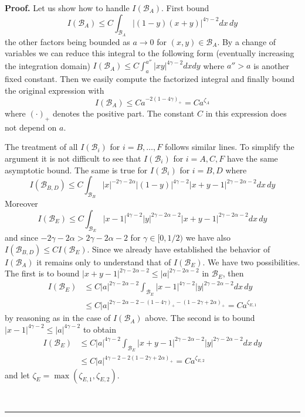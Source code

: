 \documentclass[a4paper,11pt,reqno]{article}
\newcommand{\cB}{\mathcal{B}}
\newenvironment{proof}[1][Proof]{\textbf{#1.} }{\ \rule{0.5em}{0.5em}}
\begin{document}
\begin{proof}
Let us show how to handle $I(\cB_A)$. First bound
$$
I(\cB_A) \le C \int_{\cB_A} 
|(1-y)(x+y)|^{4\gamma-2} d x\, d y
$$
the other factors being bounded as $a \to 0$ for $(x,y) \in \cB_A$. By a change of variables we can reduce this integral to the following  form (eventually increasing the integration domain)
$
I(\cB_A) \le C \int_{a}^{a''} |x y|^{4\gamma-2} dx dy
$
where $a''>a$ is another fixed constant. Then we easily compute the factorized integral and finally  bound the original expression with
$$
I(\cB_A) \le C a^{-2(1-4\gamma)_+} = C a^{\zeta_A}
$$
where $(\cdot)_+$ denotes the positive part. The constant $C$ in this expression does not depend on $a$. 

The treatment of all $I(\cB_i)$ for $i=B,\dots,F$ follows similar lines. To simplify the argument it is not difficult to see that $I(\cB_i)$ for $i=A,C,F$  have the same asymptotic bound. The same is true for $I(\cB_i)$ for $i=B,D$ where
$$
I(\cB_{B,D}) \le C \int_{\cB_B} 
|x|^{-2\gamma-2\alpha}|(1-y)|^{4\gamma-2} |x+y-1|^{2\gamma-2\alpha-2} d x\, d y
$$
Moreover
$$
I(\cB_{E}) \le C\int_{\cB_E} |x-1|^{4\gamma-2} |y|^{2\gamma-2\alpha-2} |x+y-1|^{2\gamma-2\alpha-2} dx\, dy
$$
and since $-2\gamma-2\alpha > 2\gamma-2\alpha-2$ for $\gamma \in [0,1/2)$ we have also
$
I(\cB_{B,D}) \le C I(\cB_E)
$.
Since we already have established the behavior of $I(\cB_A)$ it remains only to understand that of $I(\cB_E)$. We have two possibilities.
The first is to bound $|x+y-1|^{2\gamma-2\alpha-2} \le |a|^{2\gamma-2\alpha-2}$ in $\cB_E$, then
\begin{equation*}
  \begin{split}
I(\cB_{E}) & \le C |a|^{2\gamma-2\alpha-2} \int_{\cB_E} |x-1|^{4\gamma-2} |y|^{2\gamma-2\alpha-2}  dx\, dy
\\ & \le C |a|^{2\gamma-2\alpha-2 - (1-4\gamma)_+ - (1-2\gamma+2\alpha)_+}  = C a^{\zeta_{E,1}}  
  \end{split}
\end{equation*}
by reasoning as in the case of $I(\cB_A)$ above. The second is to bound $|x-1|^{4\gamma-2}\le |a|^{4\gamma-2}$ to obtain
\begin{equation*}
  \begin{split}
I(\cB_{E}) & \le C |a|^{4\gamma-2} \int_{\cB_E} |x+y-1|^{2\gamma-2\alpha-2} |y|^{2\gamma-2\alpha-2}  dx\, dy
\\ & \le C |a|^{4\gamma-2 - 2(1-2\gamma+2\alpha)_+}  = C a^{\zeta_{E,2}}  
  \end{split}
\end{equation*}
and let $\zeta_E = \max(\zeta_{E,1},\zeta_{E,2})$.


\end{proof}
\end{document}
